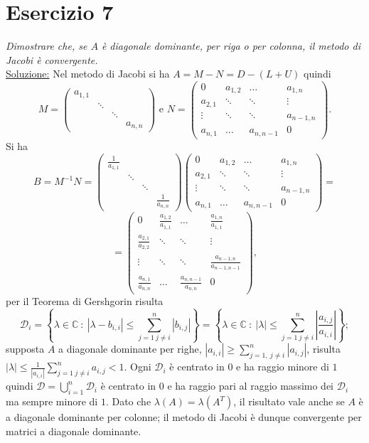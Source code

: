 \section{Esercizio 7}
\label{sub:es7}
\emph{Dimostrare che, se $A$ è diagonale dominante, per riga o per colonna, il metodo di Jacobi è convergente.}\\
\underline{Soluzione:}
Nel metodo di Jacobi si ha $A=M-N=D-(L+U)$ quindi
$$M=\begin{pmatrix}a_{1,1}&&&\\&\ddots&&\\&&\ddots&\\&&&a_{n,n}\end{pmatrix}\mbox{ e }
N=\begin{pmatrix}0&a_{1,2}&\ldots&a_{1,n}\\a_{2,1}&\ddots&\ddots&\vdots\\\vdots&\ddots&\ddots&a_{n-1,n}\\
a_{n,1}&\ldots&a_{n,n-1}&0\end{pmatrix}.$$
Si ha $$B=M^{-1}N=\begin{pmatrix}\frac{1}{a_{1,1}}&&&\\&\ddots&&\\&&\ddots&\\&&&\frac{1}{a_{n,n}}\end{pmatrix}
\begin{pmatrix}0&a_{1,2}&\ldots&a_{1,n}\\a_{2,1}&\ddots&\ddots&\vdots\\\vdots&\ddots&\ddots&a_{n-1,n}\\a_{n,1}&\ldots&a_{n,n-1}&0\end{pmatrix}=$$$$=
  \begin{pmatrix}0&\frac{a_{1,2}}{a_{1,1}}&\ldots&\frac{a_{1,n}}{a_{1,1}}\\\frac{a_{2,1}}{a_{2,2}}&\ddots&\ddots&\vdots\\\vdots&\ddots&\ddots&\frac{a_{n-1,n}}{a_{n-1,n-1}}\\\frac{a_{n,1}}{a_{n,n}}&\ldots&\frac{a_{n,n-1}}{a_{n,n}}&0\end{pmatrix},$$
per il Teorema di Gershgorin risulta
$$\mathcal{D}_i=\left\{\lambda\in\mathbb{C}\::\:|\lambda-b_{i,i}|\leq\sum_{j=1\: j\neq i}^{n}{|b_{i,j}|}\right\}=\left\{\lambda\in\mathbb{C}\::\:|\lambda|\leq\sum_{j=1\: j\neq i}^{n}{\left|\frac{a_{i,j}}{a_{i,i}}\right|}\right\};$$ supposta $A$ a diagonale dominante per righe, $|a_{i,i}|\geq\sum_{j=1,\: j\neq i}^n{|a_{i,j}|}$, risulta $|\lambda|\leq\frac{1}{|a_{i,i}|}\sum_{j=1\: j\neq i}^{n}{a_{i,j}}<1$. Ogni $\mathcal{D}_i$ è centrato in $0$ e ha raggio minore di $1$ quindi $\mathcal{D}=\bigcup_{i=1}^{n}{\mathcal{D}_i}$ è centrato in $0$ e ha raggio pari al raggio massimo dei $\mathcal{D}_i$ ma sempre minore di $1$. Dato che $\lambda(A)=\lambda(A^T)$,
il risultato vale anche se $A$ è a diagonale dominante per colonne;
il metodo di Jacobi è dunque convergente per matrici a diagonale dominante.
